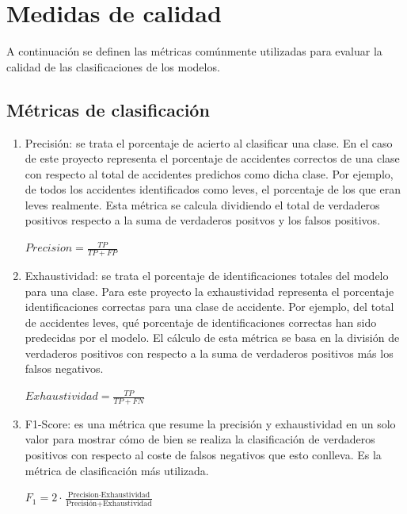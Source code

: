     \section{Medidas de calidad}

        A continuación se definen las métricas comúnmente utilizadas para evaluar la calidad de las clasificaciones de los modelos.


        \subsection{Métricas de clasificación}

        \begin{enumerate}

            \item Precisión: se trata el porcentaje de acierto al clasificar una clase. En el caso de este proyecto representa el porcentaje de accidentes correctos de una clase con respecto al total de accidentes predichos como dicha clase. Por ejemplo, de todos los accidentes identificados como leves, el porcentaje de los que eran leves realmente. Esta métrica se calcula dividiendo el total de verdaderos positivos respecto a la suma de verdaderos positvos y los falsos positivos.

                \begin{center}
                    $Precision = \frac{TP}{TP + FP}$
                \end{center}

            \item Exhaustividad: se trata el porcentaje de identificaciones totales del modelo para una clase. Para este proyecto la exhaustividad representa el porcentaje identificaciones correctas para una clase de accidente. Por ejemplo, del total de accidentes leves, qué porcentaje de identificaciones correctas han sido predecidas por el modelo. El cálculo de esta métrica se basa en la división de verdaderos positivos con respecto a la suma de verdaderos positivos más los falsos negativos.

                \begin{center}
                    $Exhaustividad = \frac{TP}{TP + FN}$
                \end{center}

            \item F1-Score: es una métrica que resume la precisión y exhaustividad en un solo valor para mostrar cómo de bien se realiza la clasificación de verdaderos positivos con respecto al coste de falsos negativos que esto conlleva. Es la métrica de clasificación más utilizada.

                \begin{center}
                    $F_{1} = 2 \cdot \frac{\text{Precision} \cdot \text{Exhaustividad}} {\text{Precisión} + \text{Exhaustividad}}$
                \end{center}

        \end{enumerate}


